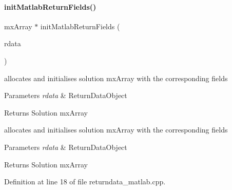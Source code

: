 \paragraph{\texorpdfstring{initMatlabReturnFields()}{initMatlabReturnFields()}}
{\footnotesize\ttfamily mx\+Array $\ast$ init\+Matlab\+Return\+Fields (\begin{DoxyParamCaption}\item[{\mbox{\hyperlink{classamici_1_1_return_data}{Return\+Data}} const $\ast$}]{rdata }\end{DoxyParamCaption})}

allocates and initialises solution mx\+Array with the corresponding fields


\begin{DoxyParams}{Parameters}
{\em rdata} & Return\+Data\+Object\\
\hline
\end{DoxyParams}
\begin{DoxyReturn}{Returns}
Solution mx\+Array
\end{DoxyReturn}
allocates and initialises solution mx\+Array with the corresponding fields


\begin{DoxyParams}{Parameters}
{\em rdata} & Return\+Data\+Object\\
\hline
\end{DoxyParams}
\begin{DoxyReturn}{Returns}
Solution mx\+Array
\end{DoxyReturn}


Definition at line 18 of file returndata\+\_\+matlab.\+cpp.

